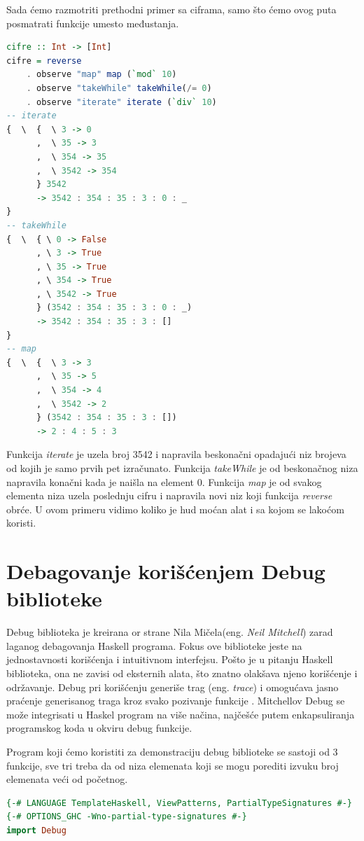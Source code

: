 \documentclass[a4paper]{article}
\begin{document}
{{Sada ćemo razmotriti prethodni primer sa ciframa, samo što ćemo ovog puta posmatrati funkcije umesto međustanja.
\begin{lstlisting}[language=Haskell]
cifre :: Int -> [Int]
cifre = reverse 
	. observe "map" map (`mod` 10)
	. observe "takeWhile" takeWhile(/= 0)
	. observe "iterate" iterate (`div` 10)
-- iterate 
{  \  {  \ 3 -> 0
      ,  \ 35 -> 3
      ,  \ 354 -> 35
      ,  \ 3542 -> 354
      } 3542
      -> 3542 : 354 : 35 : 3 : 0 : _
}
-- takeWhile
{  \  { \ 0 -> False
      , \ 3 -> True
      , \ 35 -> True
      , \ 354 -> True
      , \ 3542 -> True
      } (3542 : 354 : 35 : 3 : 0 : _)
      -> 3542 : 354 : 35 : 3 : []
}
-- map
{  \  {  \ 3 -> 3
      ,  \ 35 -> 5
      ,  \ 354 -> 4
      ,  \ 3542 -> 2  
      } (3542 : 354 : 35 : 3 : [])
      -> 2 : 4 : 5 : 3
\end{lstlisting}
Funkcija {\em iterate} je uzela broj 3542 i napravila beskonačni opadajući niz brojeva od kojih je samo prvih pet izračunato.
Funkcija {\em takeWhile} je od beskonačnog niza napravila konačni kada je naišla na element 0.
Funkcija {\em map} je od svakog elementa niza uzela poslednju cifru i napravila novi niz koji funkcija {\em reverse} obrće.
U ovom primeru vidimo koliko je hud moćan alat i sa kojom se lakoćom koristi.

\section{Debagovanje korišćenjem Debug biblioteke}
Debug biblioteka je kreirana or strane Nila Mičela(eng. {\em Neil Mitchell}) zarad laganog debagovanja Haskell programa. Fokus ove biblioteke jeste na jednostavnosti korišćenja i intuitivnom interfejsu. Pošto je u pitanju Haskell biblioteka, ona ne zavisi od eksternih alata, što znatno olakšava njeno korišćenje i održavanje. Debug pri korišćenju generiše trag (eng. {\em trace}) i omogućava jasno praćenje generisanog traga kroz svako pozivanje funkcije \cite{chitil2002transforming}.
Mitchellov Debug se može integrisati u Haskel program na više načina, najčešće putem enkapsuliranja programskog koda u okviru debug funkcije. 

Program koji ćemo koristiti za demonstraciju debug biblioteke se sastoji od 3 funkcije, sve tri treba da od niza elemenata koji se mogu porediti izvuku broj elemenata veći od početnog.

\begin{lstlisting}[caption={Okružujemo naš kod funkcijom debug, iz biblioteke Debug, sa uključivanjem ekstenzija navedenih u prvom redu}, language=Haskell]
{-# LANGUAGE TemplateHaskell, ViewPatterns, PartialTypeSignatures #-}
{-# OPTIONS_GHC -Wno-partial-type-signatures #-}
import Debug


\end{lstlisting}}}
\end{document}
